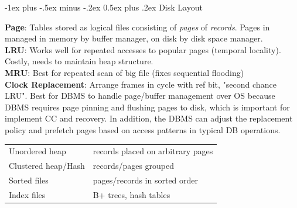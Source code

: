 \documentclass[10pt,landscape]{article}
\makeatletter
\renewcommand{\section}{\@startsection{section}{1}{0mm}%
                                {-1ex plus -.5ex minus -.2ex}%
                                {0.5ex plus .2ex}%
                                {\normalfont\large\bfseries}}
\makeatother
\begin{document}
\begin{multicols}{3}
%
%
%
%


\section{Disk Layout}

\textbf{Page}: Tables stored as logical files consisting of \textit{pages} of \textit{records}. Pages in managed in memory by buffer manager, on disk by disk space manager. \\
\textbf{LRU}: Works well for repeated accesses to popular pages (temporal locality). Costly, needs to maintain heap structure. \\
\textbf{MRU}: Best for repeated scan of big file (fixes sequential flooding) \\
\textbf{Clock Replacement}: Arrange frames in cycle with ref bit, "second chance LRU". Best for DBMS to handle page/buffer management over OS because DBMS requires page pinning and flushing pages to disk, which is important for implement CC and recovery. In addition, the DBMS can adjust the replacement policy and prefetch pages based on access patterns in typical DB operations.

\begin{tabular}{@{}ll@{}}
Unordered heap      & records placed on arbitrary pages \\
Clustered heap/Hash & records/pages grouped \\
Sorted files        & pages/records in sorted order \\
Index files         & B+ trees, hash tables
\end{tabular}


\end{multicols}
\end{document}
